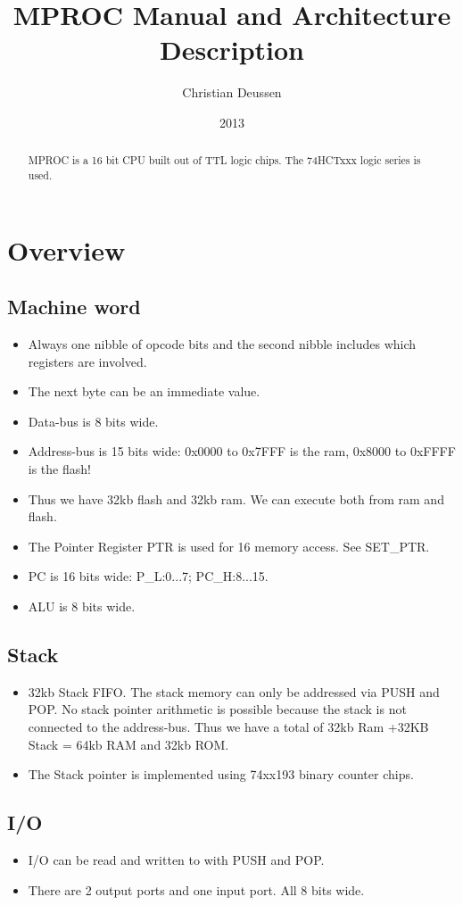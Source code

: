 \documentclass[a4paper, 12pt]{article}
\title{MPROC Manual and Architecture Description}
\author{Christian Deussen}
\date{2013}
\begin{document}
	\maketitle
	\begin{abstract}
	MPROC is a 16 bit CPU built out of TTL logic chips. The 74HCTxxx logic series is used.
	\end{abstract}
	\tableofcontents
	\newpage
	\section{Overview}
	\subsection {Machine word}
	\begin{itemize}
		\item Always one nibble of opcode bits and the second nibble includes which registers are involved.
		\item The next byte can be an immediate value.
		\item Data-bus is 8 bits wide.
		\item Address-bus is 15 bits wide: 0x0000 to 0x7FFF is the ram, 0x8000 to 0xFFFF is the flash! 
		\item Thus we have 32kb flash and 32kb ram. We can execute both from ram and flash.
		\item The Pointer Register PTR is used for 16 memory access. See SET\_PTR.
		\item PC is 16 bits wide: P\_L:0...7; PC\_H:8...15.
		\item ALU is 8 bits wide.
	\end{itemize}

	\subsection {Stack}
	\begin{itemize}
		\item 32kb Stack FIFO. The stack memory can only be addressed via PUSH and POP. No stack pointer arithmetic is possible because the stack is not connected to the address-bus.
			Thus we have a total of 32kb Ram +32KB Stack = 64kb RAM and 32kb ROM.
		\item The Stack pointer is implemented using 74xx193 binary counter chips. 
	\end{itemize}

	\subsection{I/O}
	\begin{itemize}
		\item I/O can be read and written to with PUSH and POP. 
		\item There are 2 output ports and one input port. All 8 bits wide.
	\end{itemize}
\end{document}
